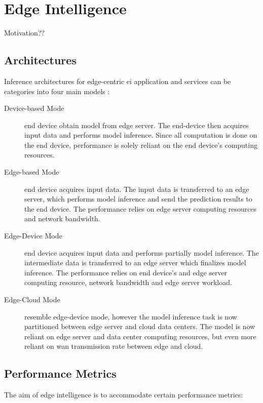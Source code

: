 \section{Edge Intelligence}

Motivation??

\subsection{Architectures}

Inference architectures for edge-centric \gls{ei} application and services can be categories into four main models \cite{zhou_edge_2019}:

\begin{description}
	\item[Device-based Mode] end device obtain model from edge server. The end-device then acquires input data and performs model inference. Since all computation is done on the end device, performance is solely reliant on the end device's computing resources.  
	\item[Edge-based Mode] end device acquires input data. The input data is transferred to an edge server, which performs model inference and send the prediction results to the end device. The performance relies on edge server computing resources and network bandwidth.
	\item[Edge-Device Mode] end device acquires input data and performs partially model inference. The intermediate data is transferred to an edge server which finalizes model inference. The performance relies on end device's and edge server computing resource, network bandwidth and edge server workload. 
	\item[Edge-Cloud Mode] resemble edge-device mode, however the model inference task is now partitioned between edge server and cloud data centers. The model is now reliant on edge server and data center computing resources, but even more reliant on \gls{wan} transmission rate between edge and cloud. 
\end{description}

\subsection{Performance Metrics}

The aim of edge intelligence is to accommodate certain performance metrics:

